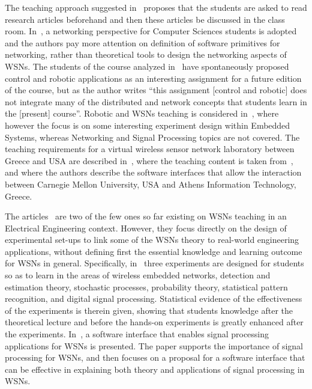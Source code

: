 \documentclass[onecolumn,12pt,draftclsnofoot,a4paper,peerreview]{IEEEtran}
\begin{document}
The teaching approach suggested in~\cite{Rollins11} proposes that the students are asked to read research articles beforehand and then these articles be discussed in the class room. In~\cite{Rollins11}, a networking perspective for Computer Sciences students is adopted and the authors pay more attention on definition of software primitives for networking, rather than theoretical tools to design the networking aspects of WSNs. The students of the course analyzed in~\cite{Rollins11} have spontaneously proposed  control and robotic applications as an interesting assignment for a future edition of the course, but as the author writes ``this assignment [control and robotic] does not integrate many of the distributed and network concepts that students learn in the [present] course''. Robotic and WSNs teaching is considered in~\cite{6375774,4914744}, where however the focus is on some interesting experiment design within Embedded Systems, whereas Networking and Signal Processing topics are not covered. The teaching requirements for a virtual wireless sensor network laboratory between Greece and USA are described in~\cite{4084615}, where the teaching content is taken from~\cite{ZhaoGuibas04}, and where the authors describe the software interfaces that allow the interaction between Carnegie Mellon University, USA and Athens Information Technology, Greece. 

The articles~\cite{Taslidere+11,4909475} are two of the few ones so far existing on WSNs teaching in an Electrical Engineering context.  However, they focus directly on the design of experimental set-ups to link some of the WSNs theory to real-world engineering applications, without defining first the essential knowledge and learning outcome for WSNs in general. Specifically, in~\cite{Taslidere+11} three experiments are designed for students so as to learn in the areas of wireless embedded networks,
detection and estimation theory, stochastic processes, probability theory, statistical pattern recognition, and digital signal processing. Statistical evidence of the effectiveness of the experiments is therein given, showing that students knowledge after the theoretical lecture and before the hands-on experiments is greatly enhanced  after the experiments. In~\cite{4909475}, a software interface that enables signal processing applications for WSNs is presented. The paper supports the importance of signal processing for WSNs, and then focuses on a proposal for a software interface that can be effective
in explaining both theory and applications of signal processing in WSNs. 
\end{document}
